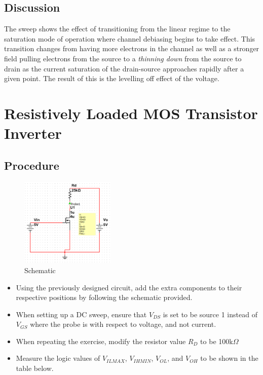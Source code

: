 \documentclass[12pt]{article}
\begin{document}
\subsection{Discussion}
The sweep shows the effect of transitioning from the linear regime to the saturation mode of operation where channel debiasing begins to take effect. This transition changes from having more electrons in the channel as well as a stronger field pulling electrons from the source to a \emph{thinning down} from the source to drain as the current saturation of the drain-source approaches rapidly after a given point. The result of this is the levelling off effect of the voltage.

\section{Resistively Loaded MOS Transistor Inverter}
\subsection{Procedure}
\begin{figure}[H]
\centering
\includegraphics[width=0.4\textwidth]{b1.png}
\caption{Schematic}
\end{figure}
\begin{itemize}
\item Using the previously designed circuit, add the extra components to their respective positions by following the schematic provided.
\item When setting up a DC sweep, ensure that $V_{DS}$ is set to be source 1 instead of $V_{GS}$ where the probe is with respect to voltage, and not current.
\item When repeating the exercise, modify the resistor value $R_D$ to be 100k$\Omega$
\item Measure the logic values of $V_{IL MAX}$, $V_{IH MIN}$, $V_{OL}$, and $V_{OH}$ to be shown in the table below.
\end{itemize}
\end{document}
